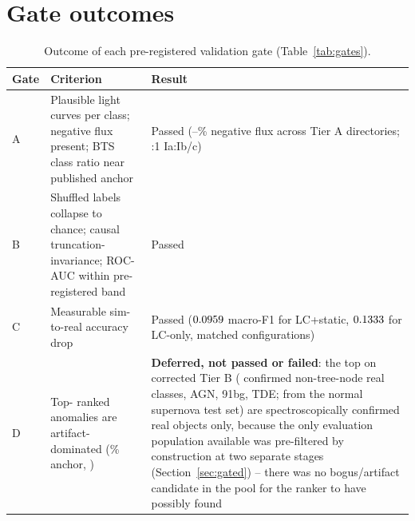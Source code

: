 \section{Gate outcomes}

\begin{table}[htb]
\centering
\caption{Outcome of each pre-registered validation gate
(Table~\ref{tab:gates}).}
\label{tab:gateoutcomes}
\small
\begin{tabular}{L{0.8cm}L{6.0cm}L{7.2cm}}
\toprule
Gate & Criterion & Result \\
\midrule
A & Plausible light curves per class; negative flux present;
  BTS class ratio near published anchor & Passed
  (\TierANegFluxMin{}--\TierANegFluxMax{}\% negative flux across Tier A
  directories; \TierBJoinRatio{}:1 Ia:Ib/c) \\
B & Shuffled labels collapse to chance; causal truncation-invariance;
  ROC-AUC within pre-registered band & Passed \\
C & Measurable sim-to-real accuracy drop & Passed
  ($0.0959{}$ macro-F1 for LC+static, $0.1333{}$
  for LC-only, matched configurations) \\
D & Top-\GateDNTotal{} ranked anomalies are artifact-dominated (\GateDArtifactAnchorPct{}\% anchor,
  \citealp{malanchev2021}) & \textbf{Deferred, not passed or failed}: the
  top \GateDNTotal{} on corrected Tier B (\GateDNNoTreeNode{} confirmed
  non-tree-node real classes, \GateDNAGN{} AGN, \GateDNNinetyOneBG{} 91bg,
  \GateDNTDE{} TDE; \GateDNFromNormal{} from the normal supernova test set)
  are spectroscopically confirmed real objects only, because the only
  evaluation population available was pre-filtered by construction at two
  separate stages (Section~\ref{sec:gated}) -- there was no bogus/artifact
  candidate in the pool for the ranker to have possibly found \\
\bottomrule
\end{tabular}
\end{table}
